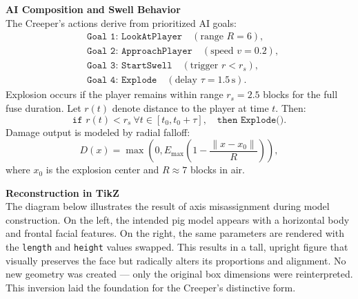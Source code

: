 \begin{technical}
\vspace{0.3em}
\noindent\textbf{AI Composition and Swell Behavior}\\[0.5em]
The Creeper’s actions derive from prioritized AI goals:
\begin{align*}
&\texttt{Goal 1: LookAtPlayer} \quad (\text{range } R = 6), \\
&\texttt{Goal 2: ApproachPlayer} \quad (\text{speed } v = 0.2), \\
&\texttt{Goal 3: StartSwell} \quad (\text{trigger } r < r_s), \\
&\texttt{Goal 4: Explode} \quad (\text{delay } \tau = 1.5\,\text{s}).
\end{align*}
Explosion occurs if the player remains within range \( r_s = 2.5 \) blocks for the full
fuse duration. Let \( r(t) \) denote distance to the player at time \( t \). Then:
\[
\texttt{if } r(t) < r_s \ \forall t \in [t_0, t_0 + \tau],
\quad \texttt{then } \texttt{Explode()}.
\]
Damage output is modeled by radial falloff:
\[
D(x) = \max\left(0, E_{\max}
\left(1 - \frac{\|x - x_0\|}{R}\right)\right),
\]
where \( x_0 \) is the explosion center and \( R \approx 7 \) blocks in air.

\vspace{0.3em}
\noindent\textbf{Reconstruction in TikZ}\\[0.5em]
The diagram below illustrates the result of axis misassignment during model construction.
On the left, the intended pig model appears with a horizontal body and frontal facial features.
On the right, the same parameters are rendered with the \texttt{length} and \texttt{height}
values swapped. This results in a tall, upright figure that visually preserves the face but
radically alters its proportions and alignment. No new geometry was created — only the
original box dimensions were reinterpreted. This inversion laid the foundation for the
Creeper’s distinctive form.

\begin{center}
\end{center}
\end{technical}
